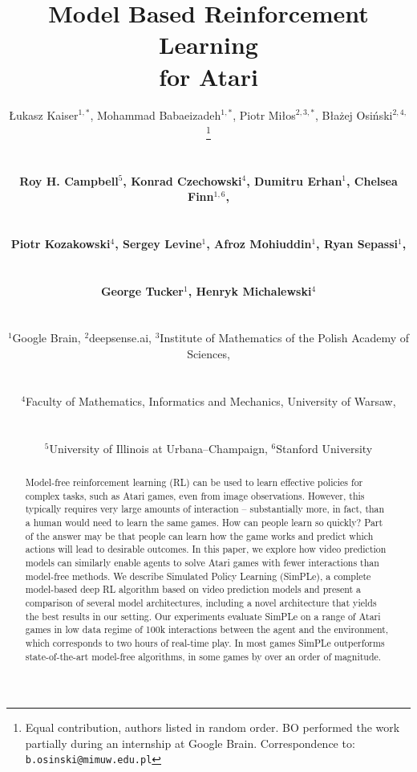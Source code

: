 \documentclass{article} %
\title{Model Based Reinforcement Learning\\ for Atari}
\author{
 \centerline{\L{}ukasz Kaiser$^{1,*}$, Mohammad Babaeizadeh$^{1,*}$,  Piotr Mi\l{}os$^{2,3,*}$, Błażej Osiński$^{2,4,}$
 \thanks{Equal contribution, authors listed in random order. BO performed the work partially
during an internship at Google Brain. Correspondence to: \texttt{b.osinski@mimuw.edu.pl}}}\\
 \centerline{\textbf{Roy H. Campbell$^5$, Konrad Czechowski$^4$, Dumitru Erhan$^1$, Chelsea Finn$^{1,6}$,}}\\
 \centerline{\textbf{Piotr Kozakowski$^4$, Sergey Levine$^{1}$, Afroz Mohiuddin$^1$, Ryan Sepassi$^1$,}}\\
 \centerline{\textbf{George Tucker$^1$,  Henryk Michalewski$^4$}}\\
 \centerline{$^1$Google Brain, $^2$deepsense.ai, $^3$Institute of Mathematics of the Polish Academy of Sciences,}\\
 \centerline{$^4$Faculty of Mathematics, Informatics and Mechanics, University of Warsaw,} \\
 \centerline{$^5$University of Illinois at Urbana–Champaign, $^6$Stanford University}
}
\begin{document}
\maketitle

\begin{abstract}
  Model-free reinforcement learning (RL) can be used to learn effective policies for complex tasks, such as Atari games, even from image observations. However, this typically requires very large amounts of interaction -- substantially more, in fact, than a human would need to learn the same games. How can people learn so quickly? Part of the answer may be that people can learn how the game works and predict which actions will lead to desirable outcomes. In this paper, we explore how video prediction models can similarly enable agents to solve Atari games with fewer interactions than model-free methods. We describe Simulated Policy Learning (SimPLe), a complete model-based deep RL algorithm based on video prediction models and present a comparison of several model architectures, including a novel architecture that yields the best results in our setting. Our experiments evaluate SimPLe on a range of Atari games in low data regime of 100k interactions between the agent and the environment, which corresponds to two hours of real-time play. In most games SimPLe outperforms state-of-the-art model-free algorithms, in some games by over an order of magnitude.
\end{abstract}











% 









\end{document}
